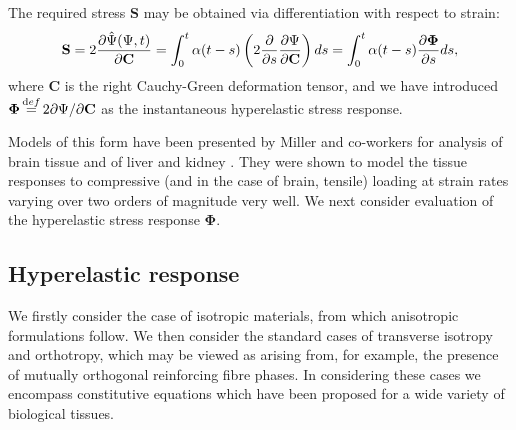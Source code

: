 \bigskip

\noindent The required stress $ \mathbf{S} $ may be obtained via differentiation with respect to strain:
\begin{equation}
\label{chap5:stress}
\mathbf{S} = 2 \dfrac{\partial \hat{\Psi}(\Psi , t)}{\partial \mathbf{C}} = \int_0^t \alpha (t-s) \left( 2 \dfrac{\partial }{\partial s} \dfrac{\partial \Psi}{\partial \mathbf{C}} \right) ds = \int_0^t \alpha (t-s) \dfrac{\partial \boldsymbol \Phi}{\partial s} ds,
\end{equation}
where $ \mathbf{C} $ is the right Cauchy-Green deformation tensor, and we have introduced $ \boldsymbol \Phi \, {\buildrel\mathrm	def\over=} \, 2 \partial \Psi / \partial \mathbf{C} $ as the instantaneous hyperelastic stress response.

\bigskip

Models of this form have been presented by Miller and co-workers for analysis of brain tissue \citep{Miller97,Miller02} and of liver and kidney \citep{Miller00}. They were shown to model the tissue responses to compressive (and in the case of brain, tensile) loading at strain rates varying over two orders of magnitude very well. We next consider evaluation of the hyperelastic stress response $ \boldsymbol \Phi $.

	\subsection{Hyperelastic response}
We firstly consider the case of isotropic materials, from which anisotropic formulations follow. We then consider the standard cases of transverse isotropy and orthotropy, which may be viewed as arising from, for example, the presence of mutually orthogonal reinforcing fibre phases. In considering these cases we encompass constitutive equations which have been proposed for a wide variety of biological tissues.
	

